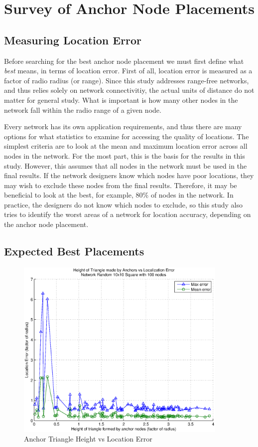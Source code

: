 \chapter{Survey of Anchor Node Placements}

\section{Measuring Location Error}
Before searching for the best anchor node placement we must first define what \emph{best} means, in terms of location error.  First of all, location error is measured as a factor of radio radius (or range).  Since this study addresses range-free networks, and thus relies solely on network connectivitiy, the actual units of distance do not matter for general study.  What is important is how many other nodes in the network fall within the radio range of a given node.  

Every network has its own application requirements, and thus there are many options for what statistics to examine for accessing the quality of locations.  The simplest criteria are to look at the mean and maximum location error across all nodes in the network.  For the most part, this is the basis for the results in this study.  However, this assumes that all nodes in the network must be used in the final results.  If the network designers know which nodes have poor locations, they may wish to exclude these nodes from the final results.  Therefore, it may be beneficial to look at the best, for example,  80\% of nodes in the network.  In practice, the designers do not know which nodes to exclude, so this study also tries to identify the worst areas of a network for location accuracy, depending on the anchor node placement.  

\section{Expected Best Placements}


\begin{figure}
  \centering
    \includegraphics[width=4in]{figures/AnchorTriangleHeightVsError-Random-10x10-Square-with-100-nodes.eps}
    \caption{Anchor Triangle Height vs Location Error}
    \label{fig:Height1}
\end{figure}

